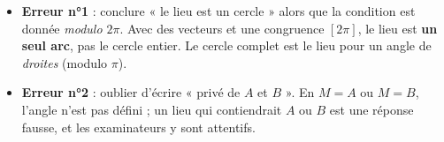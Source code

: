 \documentclass[11pt]{article}
\begin{document}
\begin{attention}
\begin{itemize}
\item \textbf{Erreur n°1} : conclure « le lieu est un cercle » alors que la condition est donnée \emph{modulo $2\pi$}. Avec des vecteurs et une congruence $[2\pi]$, le lieu est \textbf{un seul arc}, pas le cercle entier. Le cercle complet est le lieu pour un angle de \emph{droites} (modulo $\pi$).
\item \textbf{Erreur n°2} : oublier d'écrire « privé de $A$ et $B$ ». En $M = A$ ou $M = B$, l'angle n'est pas défini ; un lieu qui contiendrait $A$ ou $B$ est une réponse fausse, et les examinateurs y sont attentifs.
\end{itemize}
\end{attention}
\end{document}
